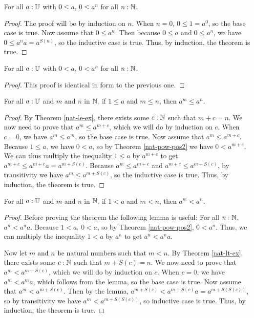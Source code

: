 \documentclass[../math.tex]{subfiles}
\begin{document}
\begin{theorem} \label{nat-pow-pos}
    For all $a : \mathbb{U}$ with $0 \leq a$, $0 \leq a^n$ for all $n : \mathbb{N}$.
\end{theorem}
\begin{proof}
    The proof will be by induction on $n$.  When $n = 0$, $0 \leq 1 = a^0$, so
    the base case is true.  Now assume that $0 \leq a^n$.  Then because $0 \leq
    a$ and $0 \leq a^n$, we have $0 \leq a^na = a^{S(n)}$, so the inductive case
    is true.  Thus, by induction, the theorem is true.
\end{proof}

\begin{theorem} \label{nat-pow-pos2}
    For all $a : \mathbb{U}$ with $0 < a$, $0 < a^n$ for all $n : \mathbb{N}$.
\end{theorem}
\begin{proof}
    This proof is identical in form to the previous one.
\end{proof}

\begin{theorem}
    For all $a : \mathbb{U}$ and $m$ and $n$ in $\mathbb{N}$, if $1 \leq a$ and $m \leq n$, then
    $a^m \leq a^n$.
\end{theorem}
\begin{proof}
    By Theorem \ref{nat-le-ex}, there exists some $c : \mathbb{N}$ such that $m + c =
    n$.  We now need to prove that $a^m \leq a^{m + c}$, which we will do by
    induction on $c$.  When $c = 0$, we have $a^m \leq a^m$, so the base case is
    true.  Now assume that $a^m \leq a^{m + c}$.  Because $1 \leq a$, we have $0
    < a$, so by Theorem \ref{nat-pow-pos2} we have $0 < a^{m + c}$.  We can thus
    multiply the inequality $1 \leq a$ by $a^{m + c}$ to get $a^{m + c} \leq
    a^{m + c}a = a^{m + S(c)}$.  Because $a^m \leq a^{m + c}$ and $a^{m + c}
    \leq a^{m + S(c)}$, by transitivity we have $a^m \leq a^{m + S(c)}$, so the
    inductive case is true.  Thus, by induction, the theorem is true.
\end{proof}

\begin{theorem}
    For all $a : \mathbb{U}$ and $m$ and $n$ in $\mathbb{N}$, if $1 < a$ and $m < n$, then $a^m
    < a^n$.
\end{theorem}
\begin{proof}
    Before proving the theorem the following lemma is useful: For all $n : \mathbb{N}$,
    $a^n < a^na$.  Because $1 < a$, $0 < a$, so by Theorem \ref{nat-pow-pos2},
    $0 < a^n$.  Thus, we can multiply the inequality $1 < a$ by $a^n$ to get
    $a^n < a^na$.

    Now let $m$ and $n$ be natural numbers such that $m < n$.  By Theorem
    \ref{nat-lt-ex}, there exists some $c : \mathbb{N}$ such that $m + S(c) = n$.  We
    now need to prove that $a^m < a^{m + S(c)}$, which we will do by induction
    on $c$.  When $c = 0$, we have $a^m < a^ma$, which follows from the lemma,
    so the base case is true.  Now assume that $a^m < a^{m + S(c)}$.  Then by
    the lemma, $a^{m + S(c)} < a^{m + S(c)}a = a^{m + S(S(c))}$, so by
    transitivity we have $a^m < a^{m + S(S(c))}$, so inductive case is true.
    Thus, by induction, the theorem is true.
\end{proof}
\end{document}
